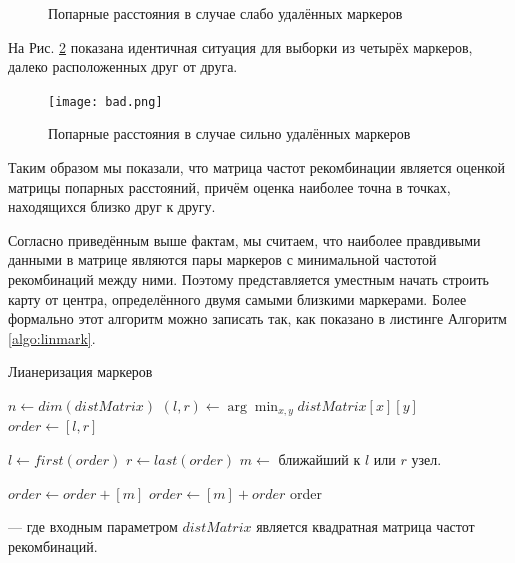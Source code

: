 \documentclass{matmex-diploma-custom}
\begin{document}
\begin{figure}[h]
  \caption[width=0.4\textwidth]{Попарные расстояния в случае слабо
    удалённых маркеров}
  \label{fig:fig1}
\end{figure}

На Рис. \ref{fig:fig2} показана идентичная ситуация для выборки из
четырёх маркеров, далеко расположенных друг от друга.

\begin{figure}[h]
 \centering
  \texttt{[image: bad.png]}
  \caption[width=0.4\textwidth]{Попарные расстояния в случае сильно
    удалённых маркеров}
  \label{fig:fig2}
\end{figure}

Таким образом мы показали, что матрица частот рекомбинации является
оценкой матрицы попарных расстояний, причём оценка наиболее точна в
точках, находящихся близко друг к другу.

Согласно приведённым выше фактам, мы считаем, что наиболее правдивыми
данными в матрице являются пары маркеров с минимальной частотой
рекомбинаций между ними. Поэтому представляется уместным начать
строить карту от центра, определённого двумя самыми близкими
маркерами. Более формально этот алгоритм можно записать так, как
показано в листинге Алгоритм \ref{algo:linmark}.
\begin{algorithm}
  \caption{Лианеризация маркеров}
  \label{algo:linmark}
  \begin{algorithmic}[1]

    \State $n \gets dim(distMatrix)$
    \State $(l, r) \gets \arg\!\min_{x, y} \mathit{distMatrix}[x][y]$
    \State $order \gets [l, r]$

    \State $l \gets first(order)$
    \State $r \gets last(order)$
    \State $m \gets $ ближайший к $l$ или $r$ узел.

    \State $order \gets order + [m]$
    \Else
    \State $order \gets [m] + order$
    \EndIf
    \EndWhile
    \State \Return order
    \EndFunction
  \end{algorithmic}
\end{algorithm}

--- где входным параметром $distMatrix$ является квадратная матрица
частот рекомбинаций.
\end{document}
